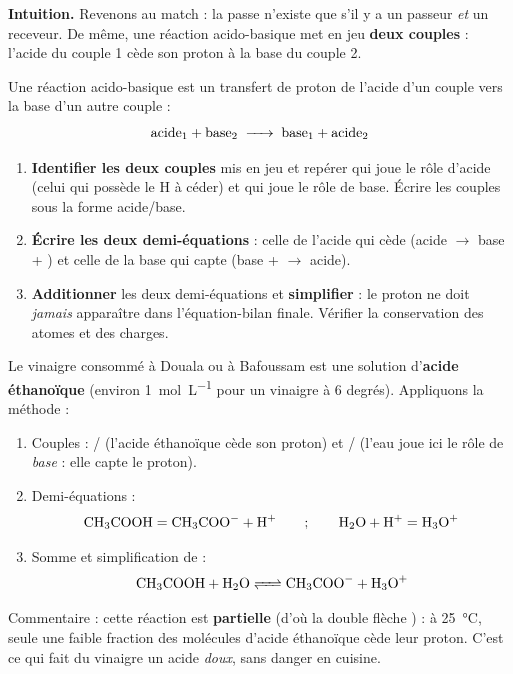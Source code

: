 \documentclass[11pt]{article}
\newcommand{\cle}[1]{{\popxbold\color{popdark}#1}}
\begin{document}
\textbf{Intuition.} Revenons au match : la passe n'existe que s'il y a un passeur \emph{et} un receveur. De même, une réaction acido-basique met en jeu \textbf{deux couples} : l'acide du couple 1 cède son proton à la base du couple 2.

\begin{definition}
Une \cle{réaction acido-basique} est un transfert de proton  de l'acide d'un couple vers la base d'un autre couple :
\[ \text{acide}_1 + \text{base}_2 \;\ce{->}\; \text{base}_1 + \text{acide}_2 \]
\end{definition}

\begin{methode}
\begin{enumerate}
\item \textbf{Identifier les deux couples} mis en jeu et repérer qui joue le rôle d'acide (celui qui possède le H à céder) et qui joue le rôle de base. Écrire les couples sous la forme acide/base.
\item \textbf{Écrire les deux demi-équations} : celle de l'acide qui cède  (acide $\to$ base + ) et celle de la base qui capte  (base +  $\to$ acide).
\item \textbf{Additionner} les deux demi-équations et \textbf{simplifier} : le proton  ne doit \emph{jamais} apparaître dans l'équation-bilan finale. Vérifier la conservation des atomes et des charges.
\end{enumerate}
\end{methode}

\begin{exemplebox}
Le vinaigre consommé à Douala ou à Bafoussam est une solution d'\textbf{acide éthanoïque}  (environ \SI{1}{mol.L^{-1}} pour un vinaigre à 6 degrés). Appliquons la méthode :
\begin{enumerate}
\item Couples : / (l'acide éthanoïque cède son proton) et / (l'eau joue ici le rôle de \emph{base} : elle capte le proton).
\item Demi-équations :
\[ \ce{CH3COOH} = \ce{CH3COO-} + \ce{H+} \qquad ; \qquad \ce{H2O} + \ce{H+} = \ce{H3O+} \]
\item Somme et simplification de  :
\[ \ce{CH3COOH + H2O <=> CH3COO- + H3O+} \]
\end{enumerate}
Commentaire : cette réaction est \textbf{partielle} (d'où la double flèche \ce{<=>}) : à \SI{25}{\celsius}, seule une faible fraction des molécules d'acide éthanoïque cède leur proton. C'est ce qui fait du vinaigre un acide \emph{doux}, sans danger en cuisine.
\end{exemplebox}
\end{document}
